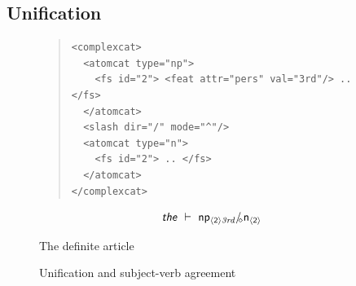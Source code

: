\documentclass[11pt]{article}
\begin{document}
\subsection{Unification}

\begin{figure}
\begin{quote}
\begin{verbatim}
<complexcat>
  <atomcat type="np">
    <fs id="2"> <feat attr="pers" val="3rd"/> .. </fs>
  </atomcat>
  <slash dir="/" mode="^"/>
  <atomcat type="n">
    <fs id="2"> .. </fs>
  </atomcat>
</complexcat>
\end{verbatim}
\end{quote}
\[
\textsf{\textsl{the}} ~ \vdash ~ \mathsf{np_{\langle2\rangle\mathit{3rd}}}/_{\!\!\diamond}\mathsf{n_{\langle2\rangle\mathit{}}}
\]
\caption{The definite article}
\label{def-art}
\end{figure}

\begin{figure}
\begin{center}

\vspace{1cm}
\end{center}
\caption{Unification and subject-verb agreement}
\label{subj-v-agr}
\end{figure}
\end{document}
